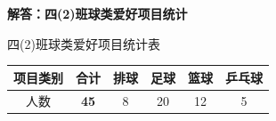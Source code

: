 ﻿%

\newpage

\begin{center}
  {\large\bfseries 解答：四(2)班球类爱好项目统计}
\end{center}

\vspace{0.4cm}

\begin{center}
  {\small 四(2)班球类爱好项目统计表} \\
  \vspace{0.2cm}
  \renewcommand{\arraystretch}{1.5}
  \begin{tabular}{|c|c|c|c|c|c|}
    \hline
    项目类别 & 合计 & 排球 & 足球 & 篮球 & 乒乓球 \\
    \hline
    人数 & \textbf{\textcolor{red!70!black}{45}} & 8 & 20 & 12 & 5 \\
    \hline
  \end{tabular}
\end{center}

\vspace{0.8cm}

